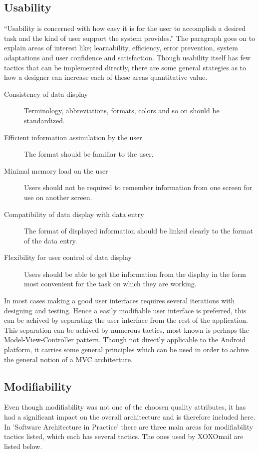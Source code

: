 	\subsection{Usability}
		``Usability is concerned with how easy it is for the user to accomplish a desired task and the kind of user support the system provides.''\cite[p. 90]{bib:archi} The paragraph goes on to explain areas of interest like; learnability, efficiency, error prevention, system adaptations and user confidence and satisfaction. Though usability itself has few tactics that can be implemented directly, there are some general stategies as to how a designer can increase each of these areas quantitative value. 
		
		\begin{description}
			\item[Consistency of data display] Terminology, abbreviations, formats, colors and so on should be standardized.
			\item[Efficient information assimilation by the user] The format should be familiar to the user. 
			\item[Minimal memory load on the user] Users should not be required to remember information from one screen for use on another screen.
			\item[Compatibility of data display with data entry] The format of displayed information should be linked clearly to the format of the data entry.
			\item[Flexibility for user control of data display] Users should be able to get the information from the display in the form most convenient for the task on which they are working.
		\end{description}


		In most cases making a good user interfaces requires several iterations with designing and testing. Hence a easily modifiable user interface is preferred, this can be achived by separating the user interface from the rest of the application. This separation can be achived by numerous tactics, most known is perhaps the Model-View-Controller pattern. Though not directly applicable to the Android platform, it carries some general principles which can be used in order to achive the general notion of a MVC architecture. 
		
	\subsection{Modifiability}
		Even though modifiability was not one of the choosen quality attributes, it has had a significant impact on the overall architecture and is therefore included here. In 'Software Architecture in Practice'\cite[p. 111]{bib:archi} there are three main areas for modifiability tactics listed, which each has several tactics. The ones used by XOXOmail are listed below.
	

